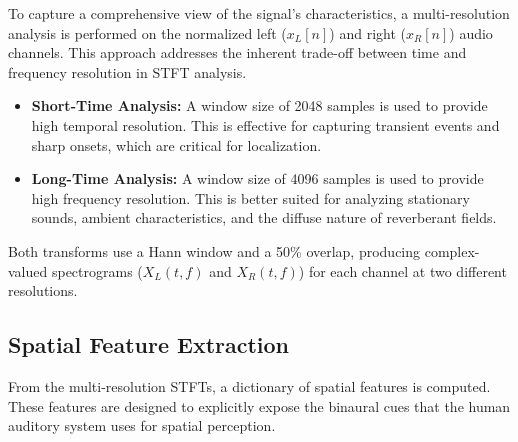 \documentclass[12pt, a4paper]{article}
\begin{document}
To capture a comprehensive view of the signal's characteristics, a multi-resolution analysis is performed on the normalized left ($x_L[n]$) and right ($x_R[n]$) audio channels. This approach addresses the inherent trade-off between time and frequency resolution in STFT analysis.
\begin{itemize}
    \item \textbf{Short-Time Analysis:} A window size of 2048 samples is used to provide high temporal resolution. This is effective for capturing transient events and sharp onsets, which are critical for localization.
    \item \textbf{Long-Time Analysis:} A window size of 4096 samples is used to provide high frequency resolution. This is better suited for analyzing stationary sounds, ambient characteristics, and the diffuse nature of reverberant fields.
\end{itemize}
Both transforms use a Hann window and a 50\% overlap, producing complex-valued spectrograms ($X_L(t,f)$ and $X_R(t,f)$) for each channel at two different resolutions.

\subsection{Spatial Feature Extraction}
From the multi-resolution STFTs, a dictionary of spatial features is computed. These features are designed to explicitly expose the binaural cues that the human auditory system uses for spatial perception.
\end{document}
